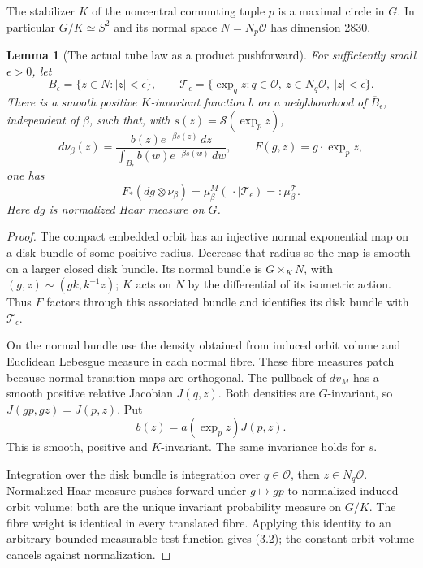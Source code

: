 \documentclass[11pt,oneside]{article}
\newtheorem{lemma}[theorem]{Lemma}
\newcommand{\cS}{\mathcal S}
\newcommand{\cO}{\mathcal O}
\newcommand{\cT}{\mathcal T}
\begin{document}
The stabilizer \(K\) of the noncentral commuting
tuple \(p\) is a maximal circle in \(G\).
In particular \(G/K\simeq S^2\) and its normal
space \(N=N_p\cO\) has dimension 2830.

\begin{lemma}[The actual tube law as a product pushforward]
\label{lem:product}
For sufficiently small \(\epsilon>0\), let
\[
 B_\epsilon=\{z\in N:|z|<\epsilon\},\qquad
 \cT_\epsilon=\{\exp_q z:q\in\cO,\ z\in N_q\cO,\
                                     |z|<\epsilon\}.
\]
There is a smooth positive \(K\)-invariant
function \(b\) on a neighbourhood of
\(\overline B_\epsilon\), independent of \(\beta\),
such that, with \(s(z)=\cS(\exp_p z)\),
\[
 d\nu_\beta(z)=
   \frac{b(z)e^{-\beta s(z)}\,dz}
        {\int_{B_\epsilon}b(w)e^{-\beta s(w)}\,dw},
 \qquad
 F(g,z)=g\cdot\exp_p z,
 \tag{3.1}
\]
one has
\[
 F_*(dg\otimes\nu_\beta)
        =\mu_\beta^M(\,\cdot\mid\cT_\epsilon)
        =:\mu_\beta^{\cT}.
 \tag{3.2}
\]
Here \(dg\) is normalized Haar measure on \(G\).
\end{lemma}
\begin{proof}
The compact embedded orbit has an injective
normal exponential map on a disk bundle of
some positive radius. Decrease that radius
so the map is smooth on a larger closed disk
bundle. Its normal bundle is
\(G\times_K N\), with
\((g,z)\sim(gk,k^{-1}z)\); \(K\) acts on \(N\)
by the differential of its isometric action.
Thus \(F\) factors through this associated
bundle and identifies its disk bundle with
\(\cT_\epsilon\).

On the normal bundle use the density obtained
from induced orbit volume and Euclidean
Lebesgue measure in each normal fibre. These
fibre measures patch because normal transition
maps are orthogonal. The pullback of \(dv_M\)
has a smooth positive relative Jacobian \(J(q,z)\).
Both densities are \(G\)-invariant, so
\(J(gp,gz)=J(p,z)\). Put
\[
                    b(z)=a(\exp_p z)J(p,z).
\]
This is smooth, positive and \(K\)-invariant.
The same invariance holds for \(s\).

Integration over the disk bundle is integration
over \(q\in\cO\), then \(z\in N_q\cO\).
Normalized Haar measure pushes forward under
\(g\mapsto gp\) to normalized induced orbit
volume: both are the unique invariant
probability measure on \(G/K\).
The fibre weight is identical in every
translated fibre. Applying this identity to
an arbitrary bounded measurable test function
gives (3.2); the constant orbit volume cancels
against normalization.
\end{proof}
\end{document}

